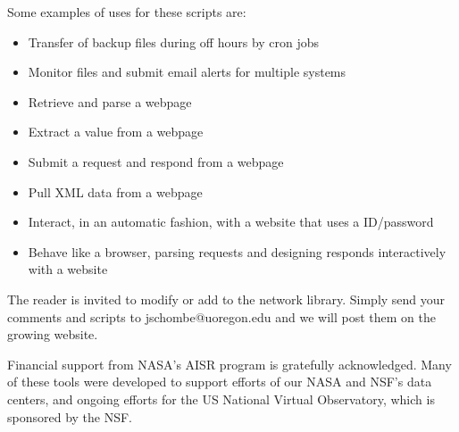 \documentclass[11pt,preprint,graphicx]{aastex}
\begin{document}
Some examples of uses for these scripts are:

\begin{itemize}

\item{} Transfer of backup files during off hours by cron jobs
\item{} Monitor files and submit email alerts for multiple systems
\item{} Retrieve and parse a webpage
\item{} Extract a value from a webpage
\item{} Submit a request and respond from a webpage
\item{} Pull XML data from a webpage
\item{} Interact, in an automatic fashion, with a website that uses a
ID/password
\item{} Behave like a browser, parsing requests and designing responds
interactively with a website

\end{itemize}

The reader is invited to modify or add to the network library.  Simply send
your comments and scripts to jschombe@uoregon.edu and we will post them on
the growing website. 

\acknowledgements

Financial support from NASA's AISR program is gratefully acknowledged.
Many of these tools were developed to support efforts of our NASA and NSF's
data centers, and ongoing efforts for the US National Virtual Observatory,
which is sponsored by the NSF.
\end{document}
